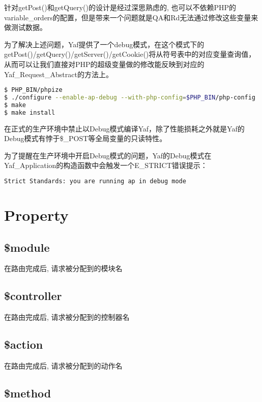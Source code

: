 针对getPost()和getQuery()的设计是经过深思熟虑的, 也可以不依赖PHP的variable\_orders的配置，但是带来一个问题就是QA和Rd无法通过修改这些变量来做测试数据。

为了解决上述问题，Yaf提供了一个debug模式，在这个模式下的getPost()/getQuery()/getServer()/getCookie()将从符号表中的对应变量查询值，从而可以让我们直接对PHP的超级变量做的修改能反映到对应的Yaf\_Request\_Abstract的方法上。

\begin{lstlisting}[language=bash]
$ PHP_BIN/phpize
$ ./configure --enable-ap-debug --with-php-config=$PHP_BIN/php-config
$ make
$ make install  
\end{lstlisting}


在正式的生产环境中禁止以Debug模式编译Yaf，除了性能损耗之外就是Yaf的Debug模式有悖于\$\_POST等全局变量的只读特性。

为了提醒在生产环境中开启Debug模式的问题，Yaf的Debug模式在Yaf\_Application的构造函数中会触发一个E\_STRICT错误提示：

\begin{lstlisting}[language=bash]
Strict Standards: you are running ap in debug mode
\end{lstlisting}




\section{Property}


\subsection{\$module}

在路由完成后, 请求被分配到的模块名

\subsection{\$controller}

在路由完成后, 请求被分配到的控制器名

\subsection{\$action}

在路由完成后, 请求被分配到的动作名

\subsection{\$method}

